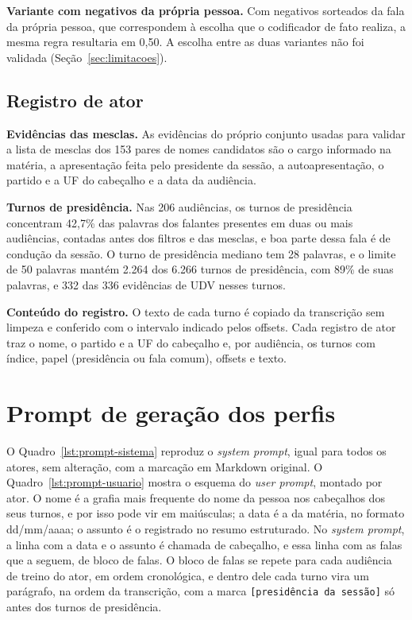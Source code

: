 \textbf{Variante com negativos da própria pessoa.} Com negativos sorteados da fala da própria pessoa,
que correspondem à escolha que o codificador de fato realiza, a mesma regra resultaria em 0,50. A
escolha entre as duas variantes não foi validada (Seção~\ref{sec:limitacoes}).

\subsection{Registro de ator}
\label{ap:regras-atores}

\textbf{Evidências das mesclas.} As evidências do próprio conjunto usadas para validar a lista de
mesclas dos 153 pares de nomes candidatos são o cargo informado na matéria, a apresentação feita pelo
presidente da sessão, a autoapresentação, o partido e a UF do cabeçalho e a data da audiência.

\textbf{Turnos de presidência.} Nas 206 audiências, os turnos de presidência concentram 42,7\% das
palavras dos falantes presentes em duas ou mais audiências, contadas antes dos filtros e das mesclas,
e boa parte dessa fala é de condução da sessão. O turno de presidência mediano tem 28 palavras, e o
limite de 50 palavras mantém 2.264 dos 6.266 turnos de presidência, com 89\% de suas palavras, e 332
das 336 evidências de UDV nesses turnos.

\textbf{Conteúdo do registro.} O texto de cada turno é copiado da transcrição sem limpeza e conferido
com o intervalo indicado pelos offsets. Cada registro de ator traz o nome, o partido e a UF do
cabeçalho e, por audiência, os turnos com índice, papel (presidência ou fala comum), offsets e texto.

\section{Prompt de geração dos perfis}
\label{ap:prompt}

O Quadro~\ref{lst:prompt-sistema} reproduz o \textit{system prompt}, igual para todos os atores, sem
alteração, com a marcação em Markdown original. O Quadro~\ref{lst:prompt-usuario} mostra o esquema do
\textit{user prompt}, montado por ator. O nome é a grafia mais frequente do nome da pessoa nos cabeçalhos
dos seus turnos, e por isso pode vir em maiúsculas; a data é a da matéria, no formato dd/mm/aaaa; o
assunto é o registrado no resumo estruturado. No \textit{system prompt}, a linha com a data e o
assunto é chamada de cabeçalho, e essa linha com as falas que a seguem, de bloco de falas. O bloco de
falas se repete para cada audiência de treino do ator,
em ordem cronológica, e dentro dele cada turno vira um parágrafo, na ordem da transcrição, com a marca
\texttt{[presidência da sessão]} só antes dos turnos de presidência.


